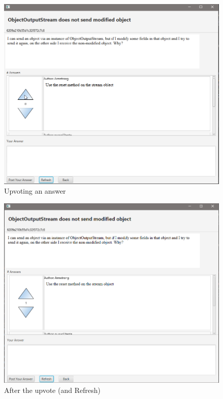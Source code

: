 \documentclass[11pt]{report}
\begin{document}
\begin{figure}[H]
  \centering
  \includegraphics[width=\textwidth,keepaspectratio=true]{img/user_manual/UpvoteRisposta2.png}
  \caption{Upvoting an answer}
  \label{fig:UpvoteRisposta2}
\end{figure}
\begin{figure}[H]
  \centering
  \includegraphics[width=\textwidth,keepaspectratio=true]{img/user_manual/UpvoteRisposta3.png}
  \caption{After the upvote (and Refresh)}
  \label{fig:UpvoteRisposta3}
\end{figure}
\end{document}
